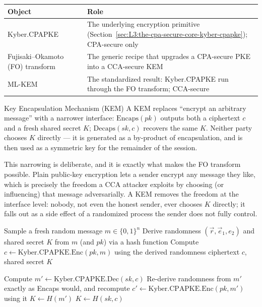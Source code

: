 \begin{center}
\renewcommand{\arraystretch}{1.3}
\begin{tabular}{|p{3.6cm}|p{10.7cm}|}
\hline
\textbf{Object} & \textbf{Role} \\
\hline
Kyber.CPAPKE & The underlying encryption primitive (Section~\ref{sec:L3:the-cpa-secure-core-kyber-cpapke}); CPA-secure only \\
Fujisaki--Okamoto (FO) transform & The generic recipe that upgrades a CPA-secure PKE into a CCA-secure KEM \\
ML-KEM & The standardized result: Kyber.CPAPKE run through the FO transform; CCA-secure \\
\hline
\end{tabular}
\end{center}

\begin{defbox}{Key Encapsulation Mechanism (KEM)}
A KEM replaces ``encrypt an arbitrary message'' with a narrower interface: $\mathrm{Encaps}(pk)$ outputs both a ciphertext $c$ and a fresh shared secret $K$; $\mathrm{Decaps}(sk,c)$ recovers the same $K$. Neither party chooses $K$ directly --- it is generated as a by-product of encapsulation, and is then used as a symmetric key for the remainder of the session.
\end{defbox}

This narrowing is deliberate, and it is exactly what makes the FO transform possible. Plain public-key encryption lets a sender encrypt any message they like, which is precisely the freedom a CCA attacker exploits by choosing (or influencing) that message adversarially. A KEM removes the freedom at the interface level: nobody, not even the honest sender, ever chooses $K$ directly; it falls out as a side effect of a randomized process the sender does not fully control.

\begin{algorithm}[ht]
\caption{ML-KEM.Encaps$(pk=(A,\vec t))$}
\begin{algorithmic}[1]
\State Sample a fresh random message $m\in\{0,1\}^n$
\State Derive randomness $(\vec r,\vec e_1,e_2)$ and shared secret $K$ from $m$ (and $pk$) via a hash function
\State Compute $c \gets \text{Kyber.CPAPKE.Enc}(pk,m)$ using the derived randomness
\State \Return ciphertext $c$, shared secret $K$
\end{algorithmic}
\end{algorithm}

\begin{algorithm}[ht]
\caption{ML-KEM.Decaps$(sk=\vec s,\ c)$}
\begin{algorithmic}[1]
\State Compute $m' \gets \text{Kyber.CPAPKE.Dec}(sk,c)$
\State Re-derive randomness from $m'$ exactly as Encaps would, and recompute $c' \gets \text{Kyber.CPAPKE.Enc}(pk,m')$ using it
    \State \Return $K \gets H(m')$
\Else
    \State \Return $K \gets H(sk,c)$ 
\EndIf
\end{algorithmic}
\end{algorithm}

